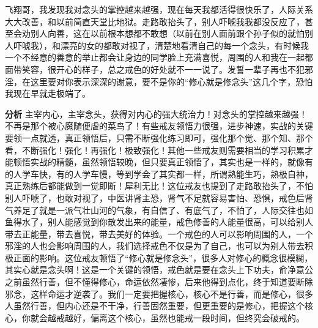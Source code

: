 \begin{case}[练习断念]
    飞翔哥，我发现我对念头的掌控越来越强，现在每天我都活得很快乐了，人际关系大大改善，和以前简直天堂比地狱。走路敢抬头了，别人吓唬我我都没反应了，甚至会劝别人向善，这在以前根本想都不敢想（以前在别人面前跟个孙子似的就怕别人吓唬我），和漂亮的女的都敢对视了，清楚地看清自己的每一个念头，有时候我一个不经意的善意的举止都会让身边的同学脸上充满喜悦，周围的人和我在一起都面带笑容，很开心的样子，总之戒色的好处就不一一说了。发誓一辈子再也不犯邪淫，在这里要对你表示深深的谢意，要不是你的“修心就是修念头”这几个字，恐怕我现在早就走极端了。

    \textbf{分析} 主宰内心，主宰念头，获得对内心的强大统治力！对念头的掌控越来越强！不再是那个被心魔随便虐的菜鸟了！有些戒友领悟力很强，进步神速，实战的关键要领一点就透，真正领悟后，只需不断强化练习即可，强化那个觉、那个知、那个看，不断强化！强化！再强化！极致强化！其他一些戒友则需要相当的学习积累才能顿悟实战的精髓，虽然领悟较晚，但只要真正领悟了，其实也是一样的，就像有的人学车快，有的人学车慢，等到学会了其实都一样，所谓熟能生巧，熟极自神，真正熟练后都能做到一觉即断！犀利无比！这位戒友也提到了走路敢抬头了，不怕别人吓唬了，也敢对视了，中医讲肾主恐，肾气不足就容易害怕、恐惧，戒色后肾气养足了就是一派气壮山河的气象，有自信了、有底气了，不怕了，人际交往也如鱼得水了，别人能感觉到你散发出来的能量，戒色修善的人能量很高，可以给别人带去正能量，带去喜悦，带去美好的体验。一个戒色的人可以影响周围的人，一个邪淫的人也会影响周围的人，我们选择戒色不仅是为了自己，也可以为别人带去积极正面的影响。这位戒友顿悟了“修心就是修念头”，很多人对修心的概念很模糊，其实心就是念头啊！这是一个关键的领悟，戒色就是要在念头上下功夫，俞净意公之前虽然行善，但不懂得修心，命运依然凄惨，后来他得到点化，终于知道要断除邪念，这样命运才逆袭了。我们一定要把握核心，核心不是行善，而是修心，很多人虽然行善，但内心还是不干净，行善固然重要，但更重要的是修心，把握这个核心，你就会越戒越好，偏离这个核心，虽然也能戒一段时间，但终究会破戒的。
\end{case}

